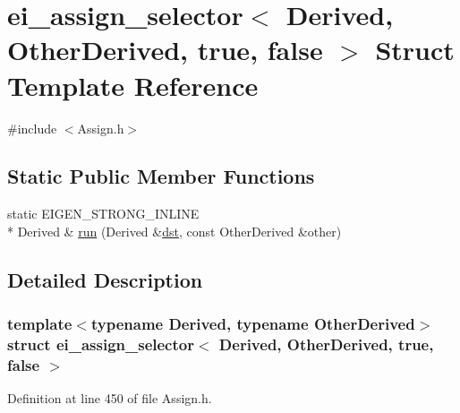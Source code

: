 \hypertarget{structei__assign__selector_3_01_derived_00_01_other_derived_00_01true_00_01false_01_4}{\section{ei\-\_\-assign\-\_\-selector$<$ Derived, Other\-Derived, true, false $>$ Struct Template Reference}
\label{structei__assign__selector_3_01_derived_00_01_other_derived_00_01true_00_01false_01_4}
}


{\ttfamily \#include $<$Assign.\-h$>$}

\subsection*{Static Public Member Functions}
\begin{DoxyCompactItemize}
\item 
static E\-I\-G\-E\-N\-\_\-\-S\-T\-R\-O\-N\-G\-\_\-\-I\-N\-L\-I\-N\-E \\*
Derived \& \hyperlink{structei__assign__selector_3_01_derived_00_01_other_derived_00_01true_00_01false_01_4_a3d692eaf24bb16ac8c8aeec88118e7d6}{run} (Derived \&\hyperlink{glext_8h_a92034251bfd455d524a9b5610cddba00}{dst}, const Other\-Derived \&other)
\end{DoxyCompactItemize}


\subsection{Detailed Description}
\subsubsection*{template$<$typename Derived, typename Other\-Derived$>$struct ei\-\_\-assign\-\_\-selector$<$ Derived, Other\-Derived, true, false $>$}



Definition at line 450 of file Assign.\-h.



